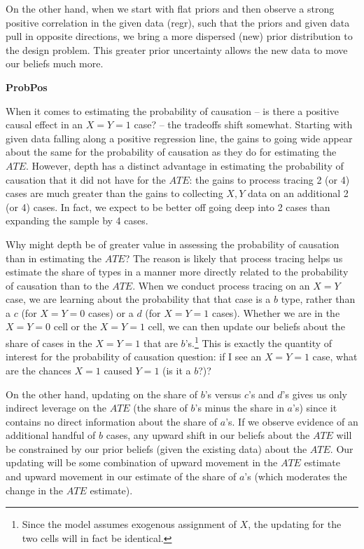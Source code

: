 \documentclass[
  12pt,
]{book}
\begin{document}
On the other hand, when we start with flat priors and then observe a strong positive correlation in the given data (regr), such that the priors and given data pull in opposite directions, we bring a more dispersed (new) prior distribution to the design problem. This greater prior uncertainty allows the new data to move our beliefs much more.

\textbf{ProbPos}

When it comes to estimating the probability of causation -- is there a positive causal effect in an \(X=Y=1\) case? -- the tradeoffs shift somewhat. Starting with given data falling along a positive regression line, the gains to going wide appear about the same for the probability of causation as they do for estimating the \(ATE\). However, depth has a distinct advantage in estimating the probability of causation that it did not have for the \(ATE\): the gains to process tracing 2 (or 4) cases are much greater than the gains to collecting \(X,Y\) data on an additional 2 (or 4) cases. In fact, we expect to be better off going deep into 2 cases than expanding the sample by 4 cases.

Why might depth be of greater value in assessing the probability of causation than in estimating the \(ATE\)? The reason is likely that process tracing helps us estimate the share of types in a manner more directly related to the probability of causation than to the \(ATE\). When we conduct process tracing on an \(X=Y\) case, we are learning about the probability that that case is a \(b\) type, rather than a \(c\) (for \(X=Y=0\) cases) or a \(d\) (for \(X=Y=1\) cases). Whether we are in the \(X=Y=0\) cell or the \(X=Y=1\) cell, we can then update our beliefs about the share of cases in the \(X=Y=1\) that are \(b\)'s.\footnote{Since the model assumes exogenous assignment of \(X\), the updating for the two cells will in fact be identical.} This is exactly the quantity of interest for the probability of causation question: if I see an \(X=Y=1\) case, what are the chances \(X=1\) caused \(Y=1\) (is it a \(b\)?)?

On the other hand, updating on the share of \(b\)'s versus \(c\)'s and \(d\)'s gives us only indirect leverage on the \(ATE\) (the share of \(b\)'s minus the share in \(a\)'s) since it contains no direct information about the share of \(a\)'s. If we observe evidence of an additional handful of \(b\) cases, any upward shift in our beliefs about the \(ATE\) will be constrained by our prior beliefs (given the existing data) about the \(ATE\). Our updating will be some combination of upward movement in the \(ATE\) estimate and upward movement in our estimate of the share of \(a\)'s (which moderates the change in the \(ATE\) estimate).
\end{document}

